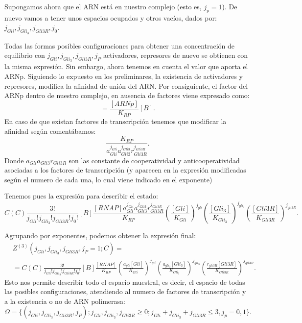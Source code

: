  Supongamos ahora que el ARN está en nuestro complejo (esto es, $j_p=1$).
 De nuevo vamos a tener unos espacios ocupados y otros vacíos, dados por: $j_{Gli}, j_{Gli_3}, j_{Gli3R}, j_0$.
 
Todas las formas posibles configuraciones para obtener una concentración de equilibrio con $j_{Gli}, j_{Gli_3}, j_{Gli3R},j_P$ activadores, represores de nuevo se obtienen con la misma expresión. 
Sin embargo, ahora tenemos en cuenta el valor que aporta el ARNp. Siguiendo lo expuesto en los preliminares, la existencia de activadores y represores, modifica la afinidad de unión del ARN. Por consiguiente, el factor del ARNp dentro de nuestro complejo, en ausencia de factores viene expresado como: 
\begin{equation}
[B.ARNp]=\frac{[ARNp]}{K_{RP}}[B].
\end{equation}
 En caso de que existan factores de transcripción tenemos que modificar la afinidad según comentábamos:
 \begin{equation}
 \frac{K_{RP}}{a_{Gli}^{j_{Gli}}a_{Gli3}^{j_{Gli3}}r_{Gli3R}^{j_{Gli3R}}}.
 \end{equation}
  Donde $a_{Gli}a_{Gli3}r_{Gli3R}$ son las constante de cooperatividad y anticooperatividad asociadas a los factores de transcripción (y aparecen en la expresión modificadas según el numero de cada una, lo cual viene indicado en el exponente)
  
  Tenemos pues la expresión para describir el estado:
\begin{equation}
\textit{C}(C)\frac{3!}{j_{Gli}! j_{Gli_3}! j_{Gli3R}!j_0!}[B]\frac{[RNAP]a_{Gli}^{j_{Gli}}a_{Gli3}^{j_{Gli3}}r_{Gli3R}^{j_{Gli3R}}}{K_{RP}}
\left(\frac{[Gli]}{K_{Gli}}\right)^{j_{gli}}
\left(\frac{[Gli_3]}{K_{Gli_3}}\right)^{j_{gli_3}}
\left(\frac{[Gli3R]}{K_{Gli3R}}\right)^{j_{gli3R}}.
\end{equation}

 Agrupando por exponentes, podemos obtener la expresión final:
\begin{equation}
\begin{split}
&Z^{(3)}(j_{Gli}, j_{Gli_3}, j_{Gli3R},j_P=1;C)=\\&=\textit{C}(C)\frac{3!}{j_{Gli}! j_{Gli_3}! j_{Gli3R}!j_0!}[B]\frac{[RNAP]}{K_{RP}}
\left(\frac{a_{gli}[Gli]}{K_{Gli}}\right)^{j_{gli}}
\left(\frac{a_{gli_3}[Gli_3]}{K_{Gli_3}}\right)^{j_{gli_3}}
\left(\frac{r_{gli3R}[Gli3R]}{K_{Gli3R}}\right)^{j_{gli3R}}.
\end{split}
\end{equation}
Esto nos permite describir todo el espacio muestral, es decir, el espacio de todas las posibles configuraciones, atendiendo al numero de factores de transcripción y a la existencia o no de ARN polimerasa:
\begin{equation}
\Omega=\{(j_{Gli}, j_{Gli_3}, j_{Gli3R},j_P);j_{Gli}, j_{Gli_3}, j_{Gli3R}\geq0;j_{Gli}+ j_{Gli_3}+ j_{Gli3R}\leq 3,j_p=0,1\}.
\end{equation}


